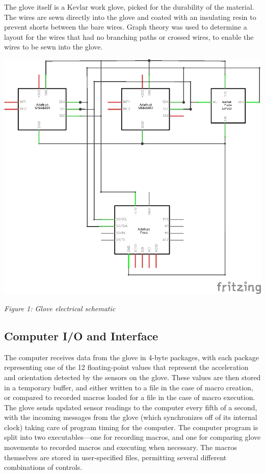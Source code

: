 \documentclass{article}
\begin{document}
	The glove itself is a Kevlar work glove, picked for the durability of the material. The wires are sewn directly into the glove and coated with an insulating resin to prevent shorts between the bare wires. Graph theory was used to determine a layout for the wires that had no branching paths or crossed wires, to enable the wires to be sewn into the glove. \newline
	
	\includegraphics{Glove_schematic}
	\newline
	\begin{center}
		\textit{Figure 1: Glove electrical schematic}
	\end{center}
	\subsection*{Computer I/O and Interface}
	
	The computer receives data from the glove in 4-byte packages, with each package representing one of the 12 floating-point values that represent the acceleration and orientation detected by the sensors on the glove. These values are then stored in a temporary buffer, and either written to a file in the case of macro creation, or compared to recorded macros loaded for a file in the case of macro execution. The glove sends updated sensor readings to the computer every fifth of a second, with the incoming messages from the glove (which synchronizes off of its internal clock) taking care of program timing for the computer. The computer program is split into two executables---one for recording macros, and one for comparing glove movements to recorded macros and executing when necessary. The macros themselves are stored in user-specified files, permitting several different combinations of controls.
	
\end{document}
